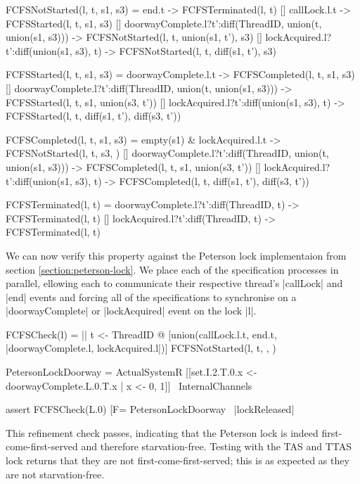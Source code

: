 \begin{cspm}
  FCFSNotStarted(l, t, s1, s3) = 
     end.t -> FCFSTerminated(l, t)
  [] callLock.l.t -> FCFSStarted(l, t, s1, s3)
  [] doorwayComplete.l?t':diff(ThreadID, union({t}, union(s1, s3))) -> FCFSNotStarted(l, t, union(s1, {t'}), s3)
  [] lockAcquired.l?t':diff(union(s1, s3), {t}) -> FCFSNotStarted(l, t, diff(s1, {t'}), s3)


FCFSStarted(l, t, s1, s3) = 
     doorwayComplete.l.t -> FCFSCompleted(l, t, s1, s3)
  [] doorwayComplete.l?t':diff(ThreadID, union({t}, union(s1, s3))) -> FCFSStarted(l, t, s1, union(s3, {t'}))
  [] lockAcquired.l?t':diff(union(s1, s3), {t}) -> FCFSStarted(l, t, diff(s1, {t'}), diff(s3, {t'}))

FCFSCompleted(l, t, s1, s3) = 
     empty(s1) & lockAcquired.l.t -> FCFSNotStarted(l, t, s3, {})
  [] doorwayComplete.l?t':diff(ThreadID, union({t}, union(s1, s3))) -> FCFSCompleted(l, t, s1, union(s3, {t'}))
  [] lockAcquired.l?t':diff(union(s1, s3), {t}) -> FCFSCompleted(l, t, diff(s1, {t'}), diff(s3, {t'}))

FCFSTerminated(l, t) = 
     doorwayComplete.l?t':diff(ThreadID, {t}) -> FCFSTerminated(l, t)
  [] lockAcquired.l?t':diff(ThreadID, {t}) -> FCFSTerminated(l, t)
\end{cspm}

We can now verify this property against the Peterson lock implementaion from section \ref{section:peterson-lock}. We place each of the specification processes in parallel, ellowing each to communicate their respective thread's |callLock| and |end| events and forcing all of the specifications to synchronise on a |doorwayComplete| or |lockAcquired| event on the lock |l|.

\begin{cspm}
FCFSCheck(l) = 
  || t <- ThreadID @ [union({callLock.l.t, end.t}, {|doorwayComplete.l, lockAcquired.l|})]
        FCFSNotStarted(l, t, {}, {})

PetersonLockDoorway = 
  ActualSystemR [[set.I.2.T.0.x <- doorwayComplete.L.0.T.x | x <- {0, 1}]] \ InternalChannels

assert FCFSCheck(L.0) [F= PetersonLockDoorway \ {|lockReleased|}
\end{cspm}

This refinement check passes, indicating that the Peterson lock is indeed first-come-first-served and therefore starvation-free. Testing with the TAS and TTAS lock returns that they are not first-come-first-served; this is as expected as they are not starvation-free.


